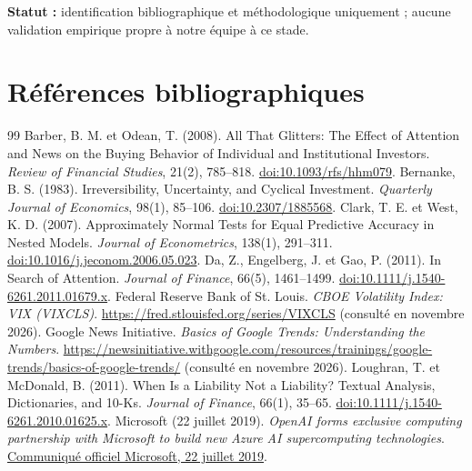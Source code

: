 \documentclass[11pt,a4paper]{article}
\begin{document}
\smallskip
\textbf{Statut :} identification bibliographique et méthodologique uniquement ; aucune validation empirique propre à notre équipe à ce stade.

\clearpage
\section*{Références bibliographiques}
\begingroup\small\setlength{\parskip}{0.08em}
\begin{thebibliography}{99}
 Barber, B. M. et Odean, T. (2008). All That Glitters: The Effect of Attention and News on the Buying Behavior of Individual and Institutional Investors. \textit{Review of Financial Studies}, 21(2), 785--818. \href{https://doi.org/10.1093/rfs/hhm079}{doi:10.1093/rfs/hhm079}.
 Bernanke, B. S. (1983). Irreversibility, Uncertainty, and Cyclical Investment. \textit{Quarterly Journal of Economics}, 98(1), 85--106. \href{https://doi.org/10.2307/1885568}{doi:10.2307/1885568}.
 Clark, T. E. et West, K. D. (2007). Approximately Normal Tests for Equal Predictive Accuracy in Nested Models. \textit{Journal of Econometrics}, 138(1), 291--311. \href{https://doi.org/10.1016/j.jeconom.2006.05.023}{doi:10.1016/j.jeconom.2006.05.023}.
 Da, Z., Engelberg, J. et Gao, P. (2011). In Search of Attention. \textit{Journal of Finance}, 66(5), 1461--1499. \href{https://doi.org/10.1111/j.1540-6261.2011.01679.x}{doi:10.1111/j.1540-6261.2011.01679.x}.
 Federal Reserve Bank of St. Louis. \textit{CBOE Volatility Index: VIX (VIXCLS)}. \url{https://fred.stlouisfed.org/series/VIXCLS} (consulté en novembre 2026).
 Google News Initiative. \textit{Basics of Google Trends: Understanding the Numbers}. \url{https://newsinitiative.withgoogle.com/resources/trainings/google-trends/basics-of-google-trends/} (consulté en novembre 2026).
 Loughran, T. et McDonald, B. (2011). When Is a Liability Not a Liability? Textual Analysis, Dictionaries, and 10-Ks. \textit{Journal of Finance}, 66(1), 35--65. \href{https://doi.org/10.1111/j.1540-6261.2010.01625.x}{doi:10.1111/j.1540-6261.2010.01625.x}.
 Microsoft (22 juillet 2019). \textit{OpenAI forms exclusive computing partnership with Microsoft to build new Azure AI supercomputing technologies}. \href{https://news.microsoft.com/source/2019/07/22/openai-forms-exclusive-computing-partnership-with-microsoft-to-build-new-azure-ai-supercomputing-technologies/}{Communiqué officiel Microsoft, 22 juillet 2019}.

\end{thebibliography}
\end{document}
